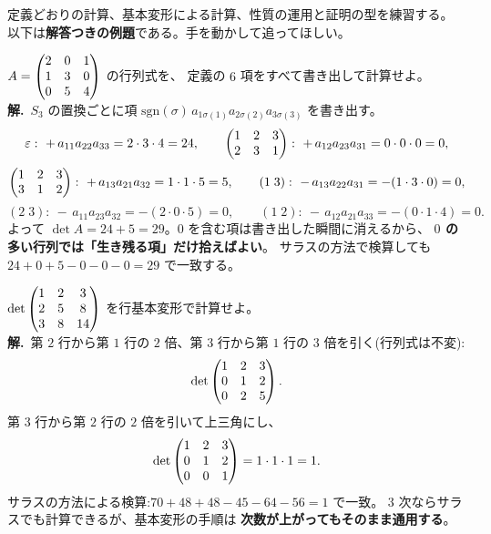 定義どおりの計算、基本変形による計算、性質の運用と証明の型を練習する。
以下は\textbf{解答つきの例題}である。手を動かして追ってほしい。

\begin{rei}[例題・基本(定義どおりの計算)]\label{rei:gendet-bydef}
$A = \begin{pmatrix}2 & 0 & 1 \\ 1 & 3 & 0 \\ 0 & 5 & 4\end{pmatrix}$ の行列式を、
定義の $6$ 項をすべて書き出して計算せよ。\\
\textbf{解.}\ $S_3$ の置換ごとに項 $\mathrm{sgn}(\sigma)\,
a_{1\sigma(1)}a_{2\sigma(2)}a_{3\sigma(3)}$ を書き出す。
\[
\varepsilon:\ +\,a_{11}a_{22}a_{33} = 2 \cdot 3 \cdot 4 = 24, \qquad
\mat{1 & 2 & 3 \\ 2 & 3 & 1}:\ +\,a_{12}a_{23}a_{31} = 0 \cdot 0 \cdot 0 = 0,
\]
\[
\begin{pmatrix}1 & 2 & 3 \\ 3 & 1 & 2\end{pmatrix}:\ +\,a_{13}a_{21}a_{32} = 1 \cdot 1 \cdot 5 = 5,
\qquad
(1\;3):\ -\,a_{13}a_{22}a_{31} = -(1 \cdot 3 \cdot 0) = 0,
\]
\[
(2\;3):\ -\,a_{11}a_{23}a_{32} = -(2 \cdot 0 \cdot 5) = 0, \qquad
(1\;2):\ -\,a_{12}a_{21}a_{33} = -(0 \cdot 1 \cdot 4) = 0.
\]
よって $\det A = 24 + 5 = 29$。$0$ を含む項は書き出した瞬間に消えるから、
\textbf{$0$ の多い行列では「生き残る項」だけ拾えばよい}。
サラスの方法で検算しても $24 + 0 + 5 - 0 - 0 - 0 = 29$ で一致する。
\end{rei}

\begin{rei}[例題・基本(基本変形による計算)]\label{rei:gendet-rowop}
$\det \begin{pmatrix}1 & 2 & 3 \\ 2 & 5 & 8 \\ 3 & 8 & 14\end{pmatrix}$ を行基本変形で計算せよ。\\
\textbf{解.}\ 第 $2$ 行から第 $1$ 行の $2$ 倍、第 $3$ 行から第 $1$ 行の
$3$ 倍を引く(行列式は不変):
\[
\det \begin{pmatrix}1 & 2 & 3 \\ 0 & 1 & 2 \\ 0 & 2 & 5\end{pmatrix}.
\]
第 $3$ 行から第 $2$ 行の $2$ 倍を引いて上三角にし、
\[
\det \begin{pmatrix}1 & 2 & 3 \\ 0 & 1 & 2 \\ 0 & 0 & 1\end{pmatrix} = 1 \cdot 1 \cdot 1 = 1.
\]
サラスの方法による検算:$70 + 48 + 48 - 45 - 64 - 56 = 1$ で一致。
$3$ 次ならサラスでも計算できるが、基本変形の手順は
\textbf{次数が上がってもそのまま通用する}。
\end{rei}

